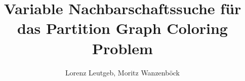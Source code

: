 \documentclass[12pt,a4paper]{report}
\title{Variable Nachbarschaftssuche für das Partition Graph Coloring Problem}
\author{Lorenz Leutgeb, Moritz Wanzenböck}
\begin{document}
	\maketitle
	\tableofcontents
	\newpage
	
	
	
	
	
	\newpage
	\listoffigures
	\lstlistoflistings
\end{document}

